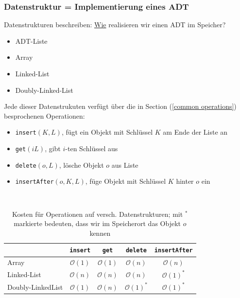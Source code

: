 \documentclass[a4paper]{article}
\begin{document}
\subsubsection*{Datenstruktur = Implementierung eines ADT}
Datenstrukturen beschreiben: \underline{Wie} realisieren wir einen ADT im Speicher?

\begin{itemize}
    \item ADT-Liste
    \item Array
    \item Linked-List
    \item Doubly-Linked-List
\end{itemize}
Jede dieser Datenstrukuten verfügt über die in Section (\ref{common operations}) besprochenen Operationen:
\begin{itemize}
    \item \texttt{insert}$(K, L)$, fügt ein Objekt mit Schlüssel $K$ am Ende der Liste an
    \item \texttt{get}$(i L)$,  gibt $i$-ten Schlüssel aus
    \item \texttt{delete}$(o, L)$, lösche Objekt $o$ aus Liste
    \item \texttt{insertAfter}$(o, K, L)$, füge Objekt mit Schlüssel $K$ hinter $o$ ein
\end{itemize}

    \begin{table}[H]
      \centering
      \footnotesize
      \caption{Kosten für Operationen auf versch. Datenstrukturen; mit $^*$ markierte bedeuten, dass wir im Speicherort das Objekt $o$ kennen}
      \label{tab:Costs on Datastructures}
      ~\\ 
      \hspace{-1.6cm}
      \begin{tabular}{|l | c | c | c | c |}
      \hline
        \textbf{} & 
        \textbf{\texttt{insert}} & 
        \textbf{\texttt{get}} &
        \textbf{\texttt{delete}} &
        \textbf{\texttt{insertAfter}} \\
        \hline
        Array & 
        $\mathcal{O}(1)$ & 
        $\mathcal{O}(1)$ &
        $\mathcal{O}(n)$ &
        $\mathcal{O}(n)$ \\
        Linked-List & 
        $\mathcal{O}(n)$ & 
        $\mathcal{O}(n)$ &
        $\mathcal{O}(n)$ &
        $\mathcal{O}(1)^*$ \\
        Doubly-LinkedList & 
        $\mathcal{O}(1)$ & 
        $\mathcal{O}(n)$ &
        $\mathcal{O}(1)^*$ &
        $\mathcal{O}(1)^*$ \\
        \hline
      \end{tabular}
    \end{table}
\end{document}
